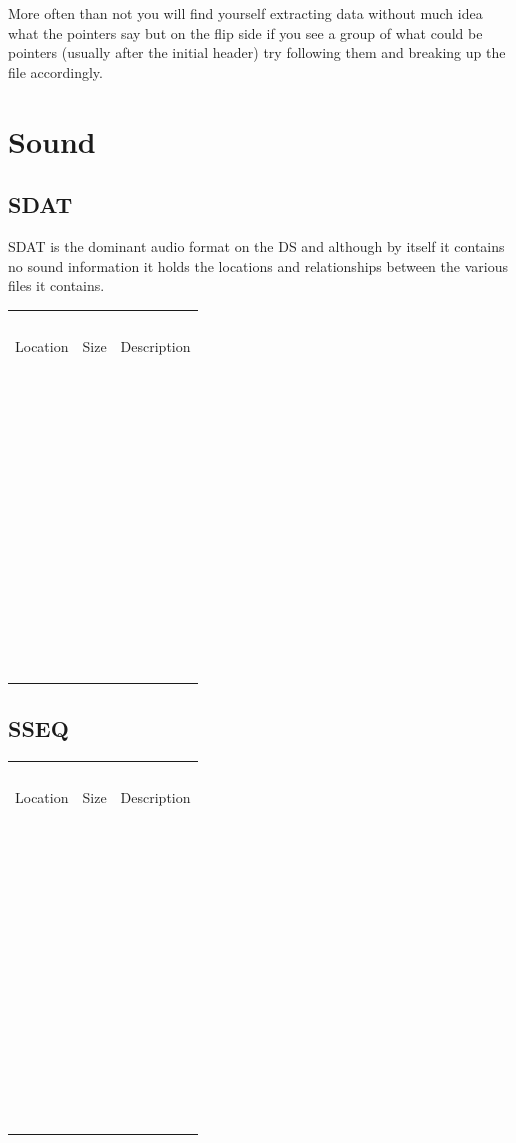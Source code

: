 \documentclass[
]{book}
\begin{document}
More often than not you will find yourself extracting data without much idea what the pointers say but on the flip side if you see a group of what could be pointers (usually after the initial header) try following them and breaking up the file accordingly.

\hypertarget{sound-1}{%
\chapter{Sound}\label{sound-1}}

\hypertarget{sdat}{%
\section{SDAT}\label{sdat}}

SDAT is the dominant audio format on the DS and although by itself it contains no sound information it holds the locations and relationships between the various files it contains.

\begin{longtable}[]{@{}lll@{}}
\toprule()
\endhead
  &   &   \\
Location & Size & Description \\
  &   &   \\
  &   &   \\
  &   &   \\
  &   &   \\
  &   &   \\
  &   &   \\
  &   &   \\
  &   &   \\
  &   &   \\
  &   &   \\
  &   &   \\
  &   &   \\
  &   &   \\
\bottomrule()
\end{longtable}

\hypertarget{sseq}{%
\section{SSEQ}\label{sseq}}

\begin{longtable}[]{@{}lll@{}}
\toprule()
\endhead
  &   &   \\
Location & Size & Description \\
  &   &   \\
  &   &   \\
  &   &   \\
  &   &   \\
  &   &   \\
  &   &   \\
  &   &   \\
  &   &   \\
  &   &   \\
  &   &   \\
  &   &   \\
  &   &   \\
  &   &   \\
\bottomrule()
\end{longtable}
\end{document}
